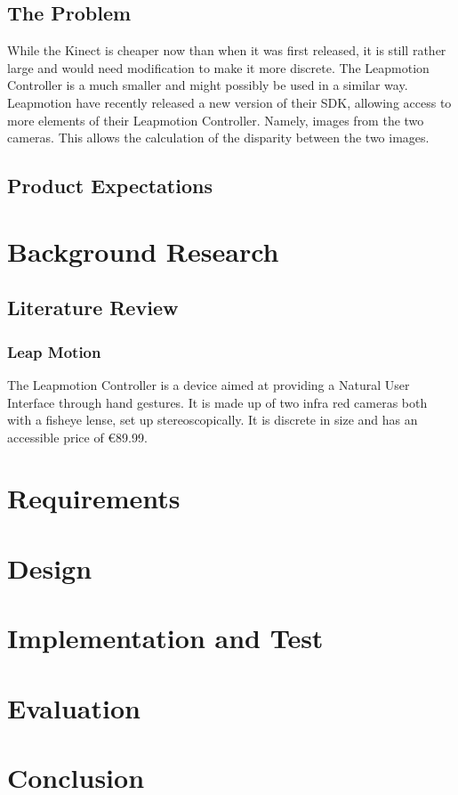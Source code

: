 \documentclass[12pt,a4paper]{report}
\begin{document}
		\section{The Problem}
While the Kinect is cheaper now than when it was first released, it is still rather large and would need modification to make it more discrete.
The Leapmotion Controller is a much smaller and might possibly be used in a similar way.
Leapmotion have recently released a new version of their SDK, allowing access to more elements of their Leapmotion Controller. 
Namely, images from the two cameras.
This allows the calculation of the disparity between the two images. %

		\section{Product Expectations}
		
	\chapter{Background Research}
		\section{Literature Review}
			\subsection{Leap Motion}
			
The Leapmotion Controller is a device aimed at providing a Natural User Interface through hand gestures.
It is made up of two infra red cameras both with a fisheye lense, set up stereoscopically.
It is discrete in size and has an accessible price of €89.99.

	\chapter{Requirements}
	\chapter{Design}
	\chapter{Implementation and Test}
	\chapter{Evaluation}
	\chapter{Conclusion}

	
	
\end{document}
